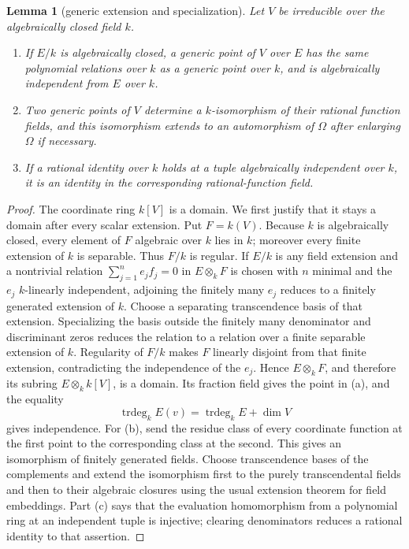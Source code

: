 \documentclass[11pt,oneside]{article}
\newtheorem{lemma}[theorem]{Lemma}
\theoremstyle{definition}
\theoremstyle{remark}
\newcommand{\trdeg}{\operatorname{trdeg}}
\begin{document}
\begin{lemma}[generic extension and specialization]\label{lem:generic-extension}
Let $V$ be irreducible over the algebraically closed field $k$.
\begin{enumerate}[label=(\alph*),leftmargin=10mm]
\item If $E/k$ is algebraically closed, a generic point of $V$ over $E$ has the same
polynomial relations over $k$ as a generic point over $k$, and is algebraically
independent from $E$ over $k$.
\item Two generic points of $V$ determine a $k$-isomorphism of their rational function
fields, and this isomorphism extends to an automorphism of $\Omega$ after enlarging
$\Omega$ if necessary.
\item If a rational identity over $k$ holds at a tuple algebraically independent over
$k$, it is an identity in the corresponding rational-function field.
\end{enumerate}
\end{lemma}
\begin{proof}
The coordinate ring $k[V]$ is a domain.  We first justify that it stays a domain after
every scalar extension.  Put $F=k(V)$.  Because $k$ is algebraically closed, every
element of $F$ algebraic over $k$ lies in $k$; moreover every finite extension of $k$ is
separable.  Thus $F/k$ is regular.  If $E/k$ is any field extension and a nontrivial
relation $\sum_{j=1}^n e_jf_j=0$ in $E\otimes_kF$ is chosen with $n$ minimal and the
$e_j$ $k$-linearly independent, adjoining the finitely many $e_j$ reduces to a finitely
generated extension of $k$.  Choose a separating transcendence basis of that extension.
Specializing the basis outside the finitely many denominator and discriminant zeros
reduces the relation to a relation over a finite separable extension of $k$.  Regularity
of $F/k$ makes $F$ linearly disjoint from that finite extension, contradicting the
independence of the $e_j$.  Hence $E\otimes_kF$, and therefore its subring
$E\otimes_k k[V]$, is a domain.  Its fraction field gives the point in (a), and the
equality
\[
 \trdeg_k E(v)=\trdeg_kE+\dim V
\]
gives independence.  For (b), send the residue class of every coordinate function at the
first point to the corresponding class at the second.  This gives an isomorphism of
finitely generated fields.  Choose transcendence bases of the complements and extend
the isomorphism first to the purely transcendental fields and then to their algebraic
closures using the usual extension theorem for field embeddings.  Part (c) says that the
evaluation homomorphism from a polynomial ring at an independent tuple is injective;
clearing denominators reduces a rational identity to that assertion.
\end{proof}
\end{document}
